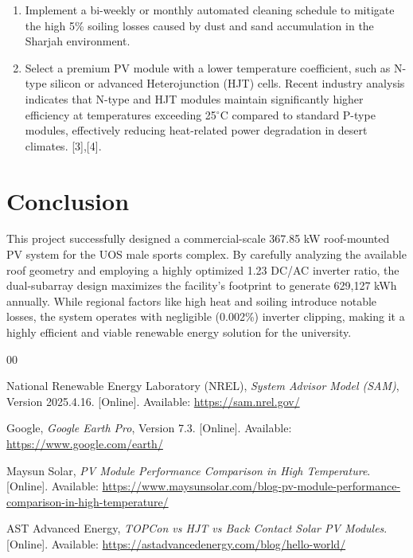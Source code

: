 \documentclass[conference]{IEEEtran}
\begin{document}
\begin{enumerate}
    \item Implement a bi-weekly or monthly automated cleaning schedule to mitigate the high 5\% soiling losses caused by dust and sand accumulation in the Sharjah environment.
    \item Select a premium PV module with a lower temperature coefficient, such as N-type silicon or advanced Heterojunction (HJT) cells. Recent industry analysis indicates that N-type and HJT modules maintain significantly higher efficiency at temperatures exceeding 25$^{\circ}$C compared to standard P-type modules, effectively reducing heat-related power degradation in desert climates. [3],[4].
\end{enumerate}

\section{Conclusion}
This project successfully designed a commercial-scale 367.85 kW roof-mounted PV system for the UOS male sports complex. By carefully analyzing the available roof geometry and employing a highly optimized 1.23 DC/AC inverter ratio, the dual-subarray design maximizes the facility's footprint to generate 629,127 kWh annually. While regional factors like high heat and soiling introduce notable losses, the system operates with negligible (0.002\%) inverter clipping, making it a highly efficient and viable renewable energy solution for the university.


\begin{thebibliography}{00}

National Renewable Energy Laboratory (NREL), \emph{System Advisor Model (SAM)}, Version 2025.4.16. [Online]. Available: \url{https://sam.nrel.gov/}


Google, \emph{Google Earth Pro}, Version 7.3. [Online]. Available: \url{https://www.google.com/earth/}

Maysun Solar, \emph{PV Module Performance Comparison in High Temperature}. [Online]. Available: \url{https://www.maysunsolar.com/blog-pv-module-performance-comparison-in-high-temperature/}

AST Advanced Energy, \emph{TOPCon vs HJT vs Back Contact Solar PV Modules}. [Online]. Available: \url{https://astadvancedenergy.com/blog/hello-world/}

\end{thebibliography}
\end{document}
